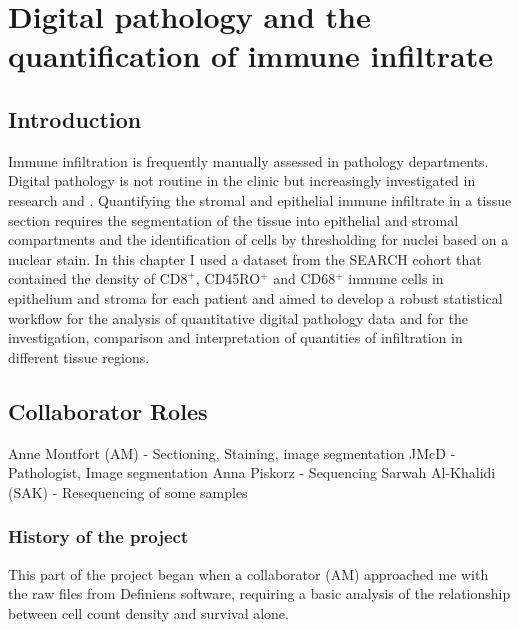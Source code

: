 
\chapter{Digital pathology and the quantification of immune infiltrate}

\ifpdf
    \graphicspath{{Chapter2/Figs/Raster/}{Chapter2/Figs/PDF/}{Chapter2/Figs/}}
\else
    \graphicspath{{Chapter2/Figs/Vector/}{Chapter2/Figs/}}
\fi

\section[Introduction]{Introduction}
Immune infiltration is frequently manually assessed in pathology departments. Digital pathology is not routine in the clinic but increasingly investigated in research and . Quantifying the stromal and epithelial immune infiltrate in a tissue section requires the segmentation of the tissue into epithelial and stromal compartments and the identification of cells by thresholding for nuclei based on a nuclear stain. In this chapter I used a dataset from the SEARCH cohort that contained the density of CD$8^+$, CD45RO$^+$ and CD68$^+$ immune cells in epithelium and stroma for each patient and aimed to develop a robust statistical workflow for the analysis of quantitative digital pathology data and for the investigation, comparison and interpretation of quantities of infiltration in different tissue regions. 

\section{Collaborator Roles}
Anne Montfort (AM) - Sectioning, Staining, image segmentation
JMcD - Pathologist, Image segmentation
Anna Piskorz - Sequencing
Sarwah Al-Khalidi (SAK) - Resequencing of some samples

\subsection{History of the project}
This part of the project began when a collaborator (AM) approached me with the raw files from Definiens software, requiring a basic analysis of the relationship between cell count density and survival alone. 

